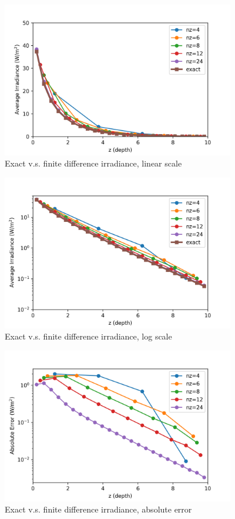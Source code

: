 \documentclass[ms,cpyr,lof,lot]{uathesis}
\begin{document}
\begin{figure}[H]
  \centering
  \includegraphics[width=4in]{exact_vs_fd_irrad}
  \caption{Exact v.s. finite difference irradiance, linear scale}
\end{figure}

\begin{figure}[H]
  \centering
  \includegraphics[width=4in]{exact_vs_fd_log_irrad}
  \caption{Exact v.s. finite difference irradiance, log scale}
\end{figure}

\begin{figure}[H]
  \centering
  \includegraphics[width=4in]{exact_vs_fd_abs_err}
  \caption{Exact v.s. finite difference irradiance, absolute error}
\end{figure}
\end{document}
